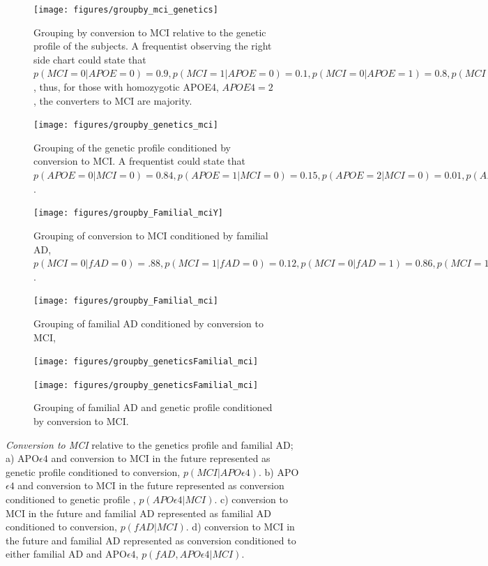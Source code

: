\documentclass[11pt]{article}
\theoremstyle{definition}
\theoremstyle{remark}
\begin{document}
\begin{figure}[H]
    \centering
    \begin{subfigure}[t]{0.4\textwidth}
        \centering
        \texttt{[image: figures/groupby\_mci\_genetics]}
        \caption{Grouping by conversion to MCI relative to the genetic profile of the subjects. A frequentist observing the right side chart could state that $p(MCI=0|APOE=0)=0.9, p(MCI=1|APOE=0)=0.1, p(MCI=0|APOE=1)=0.8, p(MCI=1|APOE=1)=0.2,p(MCI=0|APOE=2)=0.45, p(MCI=1|APOE=2)=0.55$, thus, for those with homozygotic APOE4, $APOE4=2$, the converters to MCI are majority.}
    \end{subfigure}
    \hfill
    \begin{subfigure}[t]{0.4\textwidth}
        \centering
        \texttt{[image: figures/groupby\_genetics\_mci]}
        \caption{Grouping of the genetic profile conditioned by conversion to MCI. A frequentist could state that  $p(APOE=0|MCI=0)=0.84, p(APOE=1|MCI=0)=0.15, p(APOE=2|MCI=0)=0.01,p(APOE=0|MCI=1)=0.67, p(APOE=1|MCI=1)=0.28, p(APOE=2|MCI=1)=0.05$.}
    \end{subfigure}%
    
        \begin{subfigure}[t]{0.4\textwidth}
        \centering
        \texttt{[image: figures/groupby\_Familial\_mciY]}
        \caption{Grouping of conversion to MCI conditioned by familial AD,$p(MCI=0|fAD=0)=.88, p(MCI=1|fAD=0)=0.12, p(MCI=0|fAD=1)=0.86, p(MCI=1|fAD=1)=0.14$. }
    \end{subfigure}
    \hfill
    \begin{subfigure}[t]{0.4\textwidth}
        \centering
        \texttt{[image: figures/groupby\_Familial\_mci]}
        \caption{Grouping of familial AD conditioned by conversion to MCI, }
    \end{subfigure}%

     \begin{subfigure}[t]{0.4\textwidth}
        \centering
        \texttt{[image: figures/groupby\_geneticsFamilial\_mci]}
        \caption{ }
    \end{subfigure}
    \hfill %
    \begin{subfigure}[t]{0.4\textwidth}
        \centering
        \texttt{[image: figures/groupby\_geneticsFamilial\_mci]}
        \caption{Grouping of familial AD and genetic profile conditioned by conversion to MCI.}
    \end{subfigure}%
   
    \caption{\emph{Conversion to MCI} relative to the genetics profile and familial AD; a) APO$\epsilon4$ and conversion to MCI in the future represented as genetic profile conditioned to conversion, $p(MCI|APO\epsilon4)$. b) APO$\epsilon4$ and conversion to MCI in the future represented as conversion conditioned to genetic profile , $p(APO\epsilon4|MCI)$. c) conversion to MCI in the future and familial AD  represented as familial AD conditioned to conversion, $p(fAD|MCI)$. d) conversion to MCI in the future and familial AD represented as conversion conditioned to either familial AD and APO$\epsilon4$, $p(fAD, APO\epsilon4|MCI)$.}
    \label{fig:genfami}
\end{figure}
\end{document}
